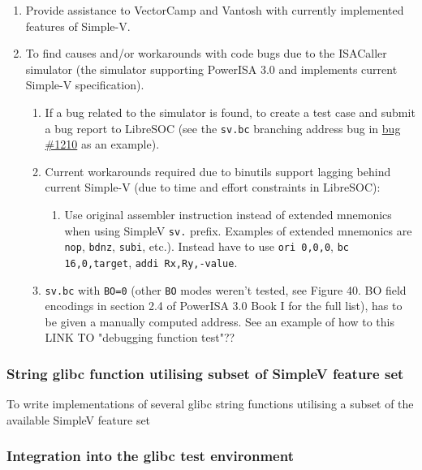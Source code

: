 \begin{enumerate}
  \item Provide assistance to VectorCamp and Vantosh with currently implemented
features of Simple-V.
  \item To find causes and/or workarounds with code bugs due to the ISACaller
simulator (the simulator supporting PowerISA 3.0 and implements current Simple-V
specification).
  \begin{enumerate}
    \item If a bug related to the simulator is found, to create a test
  case and submit a bug report to LibreSOC (see the \texttt{sv.bc} branching address
  bug in \href{https://bugs.libre-soc.org/show_bug.cgi?id=1210}{bug \#1210}
  as an example).
    \item Current workarounds required due to binutils support lagging behind
  current Simple-V (due to time and effort constraints in LibreSOC):
    \begin{enumerate}
      \item  Use original assembler instruction instead of extended mnemonics
      when using SimpleV \texttt{sv.} prefix. Examples of extended mnemonics
      are \texttt{nop}, \texttt{bdnz}, \texttt{subi}, etc.). Instead have to use 
      \texttt{ori 0,0,0}, \texttt{bc 16,0,target}, \texttt{addi Rx,Ry,-value}.
    \end{enumerate}
    \item \texttt{sv.bc} with \texttt{BO=0} (other \texttt{BO} modes weren't tested, see
  Figure 40. BO field encodings in section 2.4 of PowerISA 3.0 Book I
  for the full list), has to be given a manually computed address.
  See an example of how to this LINK TO "debugging function test"??
  \end{enumerate}
\end{enumerate}

\subsubsection{String glibc function utilising subset of SimpleV feature set}

To write implementations of several glibc string functions utilising a subset
of the available SimpleV feature set

\subsubsection{Integration into the glibc test environment}

